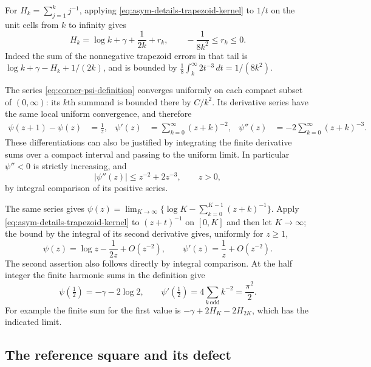 For $H_k=\sum_{j=1}^k j^{-1}$, applying
\eqref{eq:asym-details-trapezoid-kernel} to $1/t$ on the unit cells
from $k$ to infinity gives
\begin{equation}\label{eq:asym-details-harmonic-estimate}
 H_k=\log k+\gamma+\frac1{2k}+r_k,
 \qquad -\frac1{8k^2}\leq r_k\leq0.
\end{equation}
Indeed the sum of the nonnegative trapezoid errors in that tail is
$\log k+\gamma-H_k+1/(2k)$, and is bounded by
$\frac18\int_k^\infty 2t^{-3}\,dt=1/(8k^2)$.

The series \eqref{eq:corner-psi-definition} converges uniformly on
each compact subset of $(0,\infty)$: its $k$th summand is bounded
there by $C/k^2$.  Its derivative series have the same local uniform
convergence, and therefore
\begin{align}
 \psi(z+1)-\psi(z)&=\frac1z,
 &\psi'(z)&=\sum_{k=0}^{\infty}(z+k)^{-2},
 &\psi''(z)&=-2\sum_{k=0}^{\infty}(z+k)^{-3}.
 \label{eq:asym-details-psi-series}
\end{align}
These differentiations can also be justified by integrating the finite
derivative sums over a compact interval and passing to the uniform
limit.  In particular $\psi''<0$ is strictly increasing, and
\begin{equation}\label{eq:asym-details-psi-second-bound}
 |\psi''(z)|\leq z^{-2}+2z^{-3},\qquad z>0,
\end{equation}
by integral comparison of its positive series.

The same series gives
$\psi(z)=\lim_{K\to\infty}\{\log K-\sum_{k=0}^{K-1}(z+k)^{-1}\}$.
Apply \eqref{eq:asym-details-trapezoid-kernel} to
$(z+t)^{-1}$ on $[0,K]$ and then let $K\to\infty$; the bound
by the integral of its second derivative gives, uniformly for $z\geq1$,
\begin{equation}\label{eq:asym-details-psi-asymptotic}
 \psi(z)=\log z-\frac1{2z}+O(z^{-2}),\qquad
 \psi'(z)=\frac1z+O(z^{-2}).
\end{equation}
The second assertion also follows directly by integral comparison.
At the half integer the finite harmonic sums in the definition give
\begin{equation}\label{eq:asym-details-half-integer}
 \psi(\tfrac12)=-\gamma-2\log2,
 \qquad \psi'(\tfrac12)=4\sum_{k\ \mathrm{odd}}k^{-2}
                           =\frac{\pi^2}{2}.
\end{equation}
For example the finite sum for the first value is
$-\gamma+2H_K-2H_{2K}$, which has the indicated limit.

\subsection{The reference square and its defect}
\label{sec:asym-details-reference}

